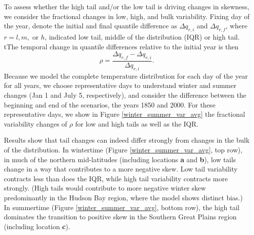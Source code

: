 \documentclass{ametsoc}
\begin{document}
To assess whether the high tail and/or the low tail is driving changes in skewness, we consider the fractional changes in low, high, and bulk variability.
{Fixing day of the year, denote the initial and final quantile difference as $\Delta q_{r, i}$ and $\Delta q_{r, f}$, where $r=l,m,$ or $h$, indicated low tail, middle of the distribution (IQR) or high tail.  tThe temporal change in quantile differences relative to the initial year is then
\begin{equation}
	\rho = \frac{\Delta q_{r, f} - \Delta q_{r, i}}{\Delta q_{r, i}}.
\label{eq:relnorm}
\end{equation}
 Because we model the complete temperature distribution for each day of the year for all years, we choose representative days to understand winter and summer changes (Jan 1 and July 5, respectively), and consider the difference between the beginning and end of the scenarios, the years 1850 and 2000. For these representative days, we show in Figure \ref{winter_summer_var_avg} the fractional variability changes of $\rho$ for low and high tails as well as the IQR. }

Results show that tail changes can indeed differ strongly from changes in the bulk of the distribution.  In wintertime (Figure \ref{winter_summer_var_avg}, top row), in much of the northern mid-latitudes (including locations \textbf{a} and \textbf{b}), low tails change in a way that contributes to a more negative skew. Low tail variability contracts less than does the IQR, while high tail variability contracts more strongly. (High tails would contribute to more negative winter skew predominantly in the Hudson Bay region, where the model shows distinct bias.) In summertime (Figure \ref{winter_summer_var_avg}, bottom row), the high tail dominates the transition to positive skew in the Southern Great Plains region (including location \textbf{c}).
\end{document}

